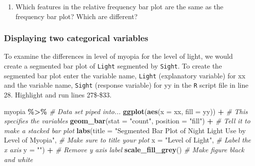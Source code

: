 \documentclass[
]{report}
\newenvironment{Shaded}{\begin{snugshade}}{\end{snugshade}}
\newcommand{\CommentTok}[1]{\textcolor[rgb]{0.56,0.35,0.01}{\textit{#1}}}
\newcommand{\DataTypeTok}[1]{\textcolor[rgb]{0.13,0.29,0.53}{#1}}
\newcommand{\KeywordTok}[1]{\textcolor[rgb]{0.13,0.29,0.53}{\textbf{#1}}}
\newcommand{\NormalTok}[1]{#1}
\newcommand{\OperatorTok}[1]{\textcolor[rgb]{0.81,0.36,0.00}{\textbf{#1}}}
\newcommand{\StringTok}[1]{\textcolor[rgb]{0.31,0.60,0.02}{#1}}
\providecommand{\tightlist}{%
  \setlength{\itemsep}{0pt}\setlength{\parskip}{0pt}}
\begin{document}
\begin{enumerate}
\def\labelenumi{\arabic{enumi}.}
\setcounter{enumi}{3}
\tightlist
\item
  Which features in the relative frequency bar plot are the same as the frequency bar plot? Which are different?
\end{enumerate}

\vspace{1in}

\newpage

\hypertarget{displaying-two-categorical-variables}{%
\subsubsection*{Displaying two categorical variables}\label{displaying-two-categorical-variables}}

To examine the differences in level of myopia for the level of light, we would create a segmented bar plot of \texttt{Light} segmented by \texttt{Sight}. To create the segmented bar plot enter the variable name, \texttt{Light} (explanatory variable) for xx and the variable name, \texttt{Sight} (response variable) for yy in the \texttt{R} script file in line 28. Highlight and run lines 27\$-\$33.

\begin{Shaded}
\begin{Highlighting}[]
\NormalTok{myopia }\OperatorTok{\%\textgreater{}\%}\StringTok{ }\CommentTok{\# Data set piped into...}
\KeywordTok{ggplot}\NormalTok{(}\KeywordTok{aes}\NormalTok{(}\DataTypeTok{x =}\NormalTok{ xx, }\DataTypeTok{fill =}\NormalTok{ yy)) }\OperatorTok{+}\StringTok{   }\CommentTok{\# This specifies the variables}
\StringTok{  }\KeywordTok{geom\_bar}\NormalTok{(}\DataTypeTok{stat =} \StringTok{"count"}\NormalTok{, }\DataTypeTok{position =} \StringTok{"fill"}\NormalTok{) }\OperatorTok{+}\StringTok{  }\CommentTok{\# Tell it to make a stacked bar plot}
\StringTok{  }\KeywordTok{labs}\NormalTok{(}\DataTypeTok{title =} \StringTok{"Segmented Bar Plot of Night Light Use by Level of Myopia"}\NormalTok{,  }
       \CommentTok{\# Make sure to title your plot }
       \DataTypeTok{x =} \StringTok{"Level of Light"}\NormalTok{,   }\CommentTok{\# Label the x axis}
       \DataTypeTok{y =} \StringTok{""}\NormalTok{) }\OperatorTok{+}\StringTok{  }\CommentTok{\# Remove y axis label}
\StringTok{    }\KeywordTok{scale\_fill\_grey}\NormalTok{()  }\CommentTok{\# Make figure black and white}
\end{Highlighting}
\end{Shaded}
\end{document}
